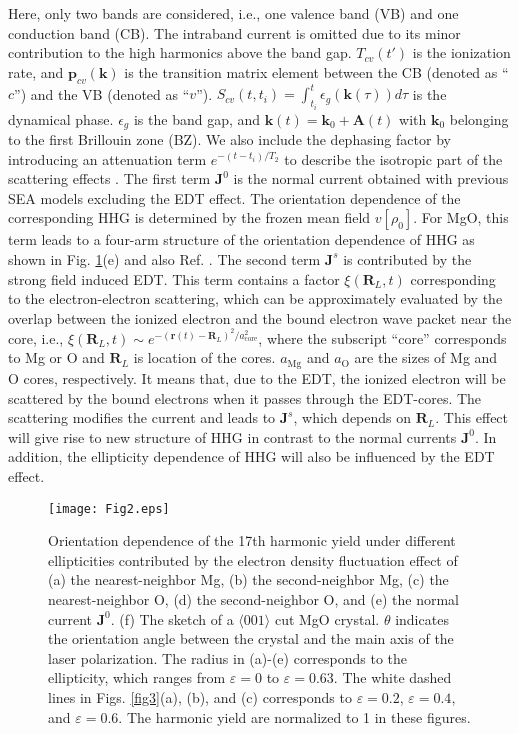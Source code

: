 \documentclass[aps,prl,10pt,preprint,nofootinbib]{revtex4-1}
\begin{document}
Here, only two bands are considered, i.e., one valence band (VB) and one conduction band (CB). The intraband current is omitted due to its minor contribution to the high harmonics above the band gap. $T_{cv}(t')$ is the ionization rate, and $\textbf{p}_{cv}(\textbf{k})$ is the transition matrix element between the CB (denoted as ``$c$'') and the VB (denoted as ``$v$''). $S_{cv}(t,t_{i}) = \int_{t_{i}}^{t}\epsilon_{g}(\textbf{k}(\tau))d\tau$ is the dynamical phase. $\epsilon_{g}$ is the band gap, and $\textbf{k}(t) = \textbf{k}_{0}+\textbf{A}(t)$ with $\textbf{k}_{0}$ belonging to the first Brillouin zone (BZ). We also include the dephasing factor by introducing an attenuation term $e^{-(t-t_{i})/T_{2}}$ to describe the isotropic part of the scattering effects \cite{McDonald2017,Vampa2017}. The first term $\textbf{J}^{0}$ is the normal current obtained with previous SEA models \cite{Li2018,Mengxi2017} excluding the EDT effect. The orientation dependence of the corresponding HHG is determined by the frozen mean field $v[\rho_{0}]$. For MgO, this term leads to a four-arm structure of the orientation dependence of HHG as shown in Fig. \ref{fig2}(e) and also Ref. \cite{Mengxi2017}. The second term $\textbf{J}^{s}$ is contributed by the strong field induced EDT. This term contains a factor $\xi(\textbf{R}_{L},t)$ corresponding to the electron-electron scattering, which can be approximately evaluated by the overlap between the ionized electron and the bound electron wave packet near the core, i.e., $\xi(\textbf{R}_{L},t)\sim e^{-(\textbf{r}(t)-\textbf{R}_{{L}})^2/a_{\text{core}}^2}$, where the subscript ``core'' corresponds to Mg or O and $\textbf{R}_{L}$ is location of the cores. $a_{\text{Mg}}$ and $a_{\text{O}}$ are the sizes of Mg and O cores, respectively. It means that, due to the EDT, the ionized electron will be scattered by the bound electrons when it passes through the EDT-cores. The scattering modifies the current and leads to $\textbf{J}^{s}$, which depends on $\textbf{R}_{L}$. This effect will give rise to new structure of HHG in contrast to the normal currents $\textbf{J}^{0}$. In addition, the ellipticity dependence of HHG will also be influenced by the EDT effect.

\begin{figure}[!t]
	\texttt{[image: Fig2.eps]}
	\caption{Orientation dependence of the 17th harmonic yield under different ellipticities contributed by the electron density fluctuation effect of (a) the nearest-neighbor Mg, (b) the second-neighbor Mg, (c) the nearest-neighbor O, (d) the second-neighbor O, and (e) the normal current $\textbf{J}^{0}$. (f) The sketch of a $\langle001\rangle$ cut MgO crystal. $\theta$ indicates the orientation angle between the crystal and the main axis of the laser polarization. The radius in (a)-(e) corresponds to the ellipticity, which ranges from $\varepsilon=0$ to $\varepsilon=0.63$. The white dashed lines in Figs. \ref{fig3}(a), (b), and (c) corresponds to $\varepsilon=0.2$, $\varepsilon=0.4$, and $\varepsilon=0.6$. The harmonic yield are normalized to 1 in these figures.}\label{fig2}
\end{figure}
\end{document}
